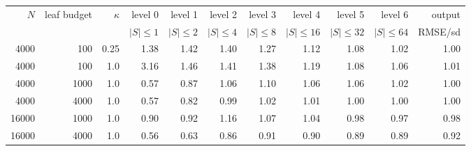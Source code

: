 \begin{tabular}{@{}rrrrrrrrrrr@{}}\toprule
$N$ & leaf budget & $\kappa$ & level 0 & level 1 & level 2 & level 3 & level 4 & level 5 & level 6 & output\\
 & & & $|S|{\le}1$ & $|S|{\le}2$ & $|S|{\le}4$ & $|S|{\le}8$ & $|S|{\le}16$ & $|S|{\le}32$ & $|S|{\le}64$ & RMSE/sd\\\midrule
4000 & 100 & 0.25 & 1.38 & 1.42 & 1.40 & 1.27 & 1.12 & 1.08 & 1.02 & 1.00\\
4000 & 100 & 1.0 & 3.16 & 1.46 & 1.41 & 1.38 & 1.19 & 1.08 & 1.06 & 1.01\\
4000 & 1000 & 1.0 & 0.57 & 0.87 & 1.06 & 1.10 & 1.06 & 1.06 & 1.02 & 1.00\\
4000 & 4000 & 1.0 & 0.57 & 0.82 & 0.99 & 1.02 & 1.01 & 1.00 & 1.00 & 1.00\\
16000 & 1000 & 1.0 & 0.90 & 0.92 & 1.16 & 1.07 & 1.04 & 0.98 & 0.97 & 0.98\\
16000 & 4000 & 1.0 & 0.56 & 0.63 & 0.86 & 0.91 & 0.90 & 0.89 & 0.89 & 0.92\\
\bottomrule\end{tabular}